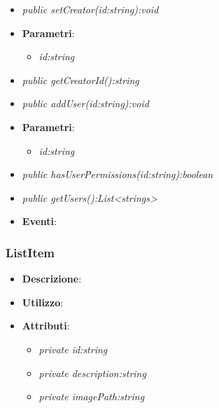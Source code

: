 \begin{itemize}
\begin{itemize}
	\item \textit{public setCreator(id:string):void}\\
	
				\item{\textbf{Parametri}: \begin{itemize}
				\item \textit{id:string}\\

			\end{itemize}}
	\item \textit{public getCreatorId():string}\\
				
	\item \textit{public addUser(id:string):void}\\
	
				\item{\textbf{Parametri}: \begin{itemize}
				\item \textit{id:string}\\

			\end{itemize}}
	\item \textit{public hasUserPermissions(id:string):boolean}\\
	
	\item \textit{public getUsers():List<strings>}\\

\item \textbf{Eventi}:
\end{itemize}

\subsubsection{ListItem}
\begin{itemize}
\item \textbf{Descrizione}:
\item \textbf{Utilizzo}:
\item \textbf{Attributi}: 
	\begin{itemize}
	\item \textit{private id:string}\\
	
	\item \textit{private description:string}\\
	
	\item \textit{private imagePath:string}\\
	

\end{itemize}
\end{itemize}
\end{itemize}
